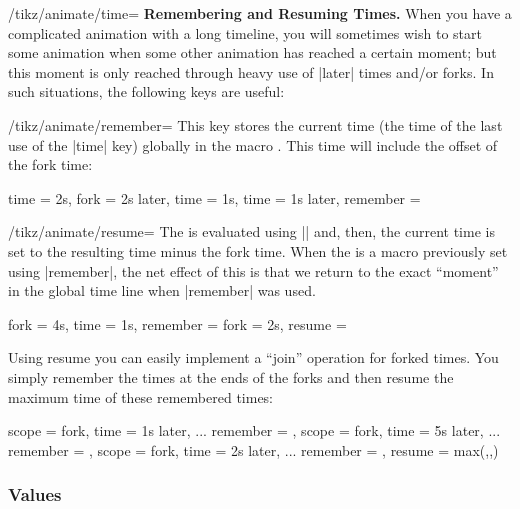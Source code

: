 \begin{key}{/tikz/animate/time=}
  \medskip\textbf{Remembering and Resuming Times.}
  When you have a complicated animation with a long timeline, you will
  sometimes wish to start some animation when some other animation has
  reached a certain moment; but this moment is only reached through
  heavy use of |later| times and/or forks. In such situations, the
  following keys are useful:
  \begin{key}{/tikz/animate/remember=}
    This key stores the current time (the time of the last use of the
    |time| key) globally in the macro . This time will include
    the offset of the fork time:
\begin{codeexample}
time = 2s,
fork = 2s later,    %
time = 1s,          %
time = 1s later,    %
remember = \mytime  %
\end{codeexample}
  \end{key}
  \begin{key}{/tikz/animate/resume=}
    The  is evaluated using |\pgfparsetime| and,
    then, the current time is set to the resulting time minus the fork
    time. When the  is a macro previously set
    using |remember|, the net effect of this is that we return to the
    exact ``moment'' in the global time line when |remember| was used.
\begin{codeexample}
fork = 4s,
time = 1s,
remember = \mytime  %
fork = 2s,          %
resume   = \mytime  %
\end{codeexample}
    Using resume you can easily implement a ``join'' operation for
    forked times. You simply remember the times at the ends of the
    forks and then resume the maximum time of these remembered times:
\begin{codeexample}
scope = {
  fork,
  time = 1s later,
  ...
  remember = \forka
},
scope = {
  fork,
  time = 5s later,
  ...
  remember = \forkb
},
scope = {
  fork,
  time = 2s later,
  ...
  remember = \forkc
},
resume = {max(\forka,\forkb,\forkc)} %
\end{codeexample}
  \end{key}
\end{key}



\subsubsection{Values}
\label{section-anim-def-values}


